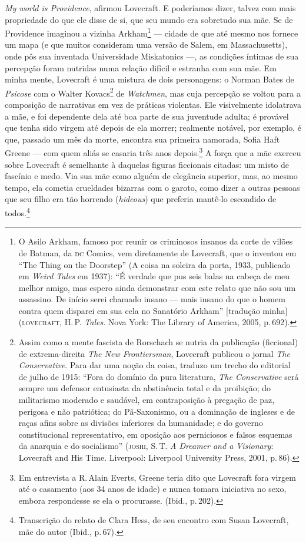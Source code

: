 \emph{My world is Providence}, afirmou Lovecraft. E poderíamos dizer,
talvez com mais propriedade do que ele disse de si, que seu mundo era
sobretudo sua mãe. Se de Providence imaginou a vizinha Arkham\footnote{O
  Asilo Arkham, famoso por reunir os criminosos insanos da corte de
  vilões de Batman, da \textsc{dc} Comics, vem diretamente de Lovecraft, que o
  inventou em ``The Thing on the Doorstep'' (A coisa na soleira da porta, 1933, publicado em
  \emph{Weird Tales} em 1937): ``É verdade que pus seis balas na cabeça
  de meu melhor amigo, mas espero ainda demonstrar com este relato que
  não sou um assassino. De início serei chamado insano --- mais insano
  do que o homem contra quem disparei em sua cela no Sanatório Arkham'' [tradução minha]
  (\textsc{lovecraft}, H.\,P. \emph{Tales}. Nova
  York: The Library of America, 2005, p.\,692).} ---
cidade de que até mesmo nos fornece um mapa (e que muitos consideram uma
versão de Salem, em Massachusetts), onde pôs sua inventada Universidade
Miskatonics ---, as condições íntimas de sua percepção foram nutridas
numa relação difícil e estranha com sua mãe. Em minha mente, Lovecraft é
uma mistura de dois personagens: o Norman Bates de \emph{Psicose} com o
Walter Kovacs\footnote{Assim como a mente fascista de Rorschach se
  nutria da publicação (ficcional) de extrema-direita \emph{The New
  Frontiersman}, Lovecraft publicou o jornal \emph{The Conservative}.
  Para dar uma noção da coisa, traduzo um trecho do editorial de
  julho de 1915: ``Fora do domínio da pura literatura, \emph{The
  Conservative} será sempre um defensor entusiasta da abstinência total
  e da proibição; do militarismo moderado e saudável, em contraposição à
  pregação de paz, perigosa e não patriótica; do Pã-Saxonismo, ou a
  dominação de ingleses e de raças afins sobre as divisões inferiores da
  humanidade; e do governo constitucional representativo, em oposição
  aos perniciosos e falsos esquemas da anarquia e do socialismo''
  (\textsc{joshi}, S.\,T. \emph{A Dreamer and a Visionary}: Lovecraft and
  His Time. Liverpool: Liverpool University Press, 2001, p.\,86).} de
\emph{Watchmen}, mas cuja percepção se voltou para a composição de
narrativas em vez de práticas violentas. Ele visivelmente idolatrava a
mãe, e foi dependente dela até boa parte de sua juventude adulta; é
provável que tenha sido virgem até depois de ela morrer; realmente
notável, por exemplo, é que, passado um mês da morte, encontra sua
primeira namorada, Sofia Haft Greene --- com quem aliás se casaria três
anos depois.\footnote{Em entrevista a R.\,Alain Everts, Greene teria dito
  que Lovecraft fora virgem até o casamento (aos 34 anos de idade) e
  nunca tomara iniciativa no sexo, embora respondesse se ela o
  procurasse. (Ibid., p.\,202).} A força que a mãe
exerceu sobre Lovecraft é semelhante à daquelas figuras ficcionais
citadas: um misto de fascínio e medo. Via sua mãe como alguém de
elegância superior, mas, ao mesmo tempo, ela cometia crueldades bizarras
com o garoto, como dizer a outras pessoas que seu filho era tão horrendo
(\emph{hideous}) que preferia mantê-lo escondido de todos.\footnote{Transcrição do relato de 
Clara Hess, de seu encontro com Susan Lovecraft, mãe do autor (Ibid., p.\,67).}

